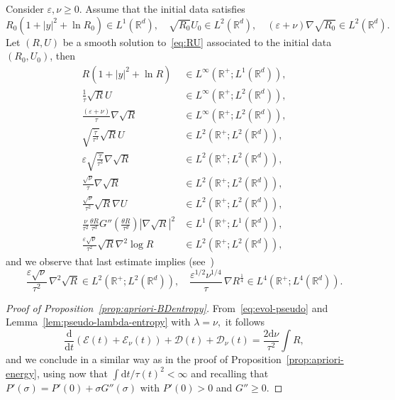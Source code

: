\documentclass[AHL,Unicode,longabstracts]{cedram}
\newcommand*\R{\mathbb{R}}
\newcommand*\dd {\mathrm{d}}
\newcommand*\<{\left\langle}
\renewcommand*\>{\right\rangle}
\renewcommand*\ge{\geqslant}
\newcommand*\eps{\varepsilon}
\begin{document}
\begin{prop}\label{prop:apriori-BDentropy}
Consider $\eps, \nu \ge 0$. Assume that the initial data satisfies
\[
R_0(1+|y|^2 + \ln R_0) \in L^1(\R^d), \quad
\sqrt{R_0} U_0 \in L^2(\R^d), \quad (\eps+\nu) \nabla \sqrt{R_0} \in L^2(\R^d).
\]
Let $(R,U)$ be a smooth solution to~\eqref{eq:RU} associated to the initial data $(R_0,U_0)$, then
\begin{equation}\label{eq:apriori-BDentropy}
\begin{aligned}
R(1+|y|^2 + \ln R) &\in L^\infty(\R^+ ; L^1(\R^d)), \\
\frac{1}{\tau} \sqrt{R} U &\in L^\infty(\R^+ ; L^2 (\R^d)), \\
\frac{(\eps+\nu)}{\tau} \nabla \sqrt{R} &\in L^\infty(\R^+ ; L^2 (\R^d)), \\
\sqrt{\frac{\dot \tau}{\tau^3}} \sqrt R U &\in L^2(\R^+ ; L^2 (\R^d)), \\
\eps \sqrt{\frac{\dot \tau}{\tau^3}} \nabla \sqrt{R} &\in L^2(\R^+ ; L^2 (\R^d)), \\
\frac{\sqrt \nu}{\tau} \nabla \sqrt{R} &\in L^2(\R^+ ; L^2 (\R^d)), \\
\frac{\sqrt \nu}{\tau^2} \sqrt{R} \nabla U &\in L^2(\R^+ ; L^2 (\R^d)), \\
\frac{ \nu}{\tau^2} \frac{\theta R}{\tau^d} G'' \left(\frac{\theta R}{\tau^d} \right) |\nabla \sqrt R|^2 &\in L^1(\R^+;L^1(\R^d)),\\
\frac{\eps \sqrt \nu }{\tau^2} \sqrt R \nabla^2 \log R &\in L^2(\R^+ ; L^2 (\R^d)),
\end{aligned}
\end{equation}
and we observe that last estimate implies (see~\cite{Jungel,VasseurYu})
\[
\frac{\eps \sqrt \nu }{\tau^2} \, \nabla^2 \sqrt R \in L^2(\R^+ ; L^2 (\R^d)),
\quad
\frac{\eps^{1/2} \nu^{1/4} }{\tau} \, \nabla R^{\frac14} \in L^4(\R^+ ; L^4 (\R^d)).
\]
\end{prop}

\begin{proof}[Proof of Proposition~\ref{prop:apriori-BDentropy}]
From~\eqref{eq:evol-pseudo} and Lemma~\ref{lem:pseudo-lambda-entropy} with $\lambda = \nu,$ it follows
\[
\frac{\dd }{\dd t} \left(\mathcal E(t) + \mathcal E_{\nu}(t) \right) + \mathcal D(t) + \mathcal D_{\nu}(t) = \frac{2 \dd\nu}{\tau^2} \int R,
\]
and we conclude in a similar way as in the proof of Proposition~\ref{prop:apriori-energy}, using now that $\int \dd t/\tau(t)^{2} < \infty$ and recalling that $P'(\sigma) = P'(0) + \sigma G''(\sigma)$ with $P'(0) >0$ and $G'' \ge 0$.
\end{proof}
\end{document}
